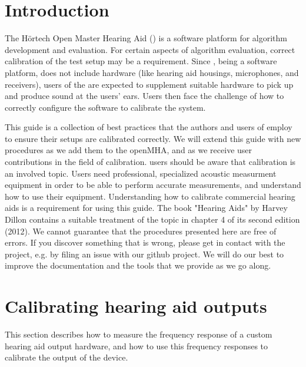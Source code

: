 \documentclass[11pt,a4paper,twoside]{article}
\newcommand{\+}{\discretionary{\mbox{\scriptsize$\hookleftarrow$}}{}{}}
\begin{document}
\newpage
\MHAcopyright{}
\newpage
\tableofcontents
\newpage
\renewcommand{\leftmark}{\rightmark}

\section{Introduction}

The H\"{o}rtech Open Master Hearing Aid (\mha{}) is a software platform
for algorithm development and evaluation.
%
For certain aspects of algorithm evaluation, correct calibration of the
test setup may be a requirement.
%
Since \mha{}, being a software platform, does not include hardware
(like hearing aid housings, microphones, and receivers),
users of the \mha{} are expected to supplement suitable hardware
to pick up and produce sound at the users' ears.
%
Users then face the challenge of how to correctly configure the software
to calibrate the system.

This guide is a collection of best practices that the authors and users
of \mha{} employ to ensure their setups are calibrated correctly.
%
We will extend this guide with new procedures as we add them to the
openMHA, and as we receive user contributions in the field of
calibration.
%
\mha{} users should be aware that calibration is an involved topic.
%
Users need professional, specialized acoustic measurment equipment in
order to be able to perform accurate measurements, and understand
how to use their equipment.
%
Understanding how to calibrate commercial hearing aids is a requirement
for using this guide.
%
The book "Hearing Aids" by Harvey Dillon contains a suitable treatment
of the topic in chapter 4 of its second edition (2012).
%
We cannot guarantee that the procedures presented here are free of
errors.
%
If you discover something that is wrong, please get in contact with
the \mha{} project, e.g. by filing an issue with our github project.
%
We will do our best to improve the documentation and the tools that we
provide as we go along.

\section{Calibrating hearing aid outputs}

This section describes how to measure the frequency response of a
custom hearing aid output hardware, and how to use this frequency
responses to calibrate the output of the device.

%
\end{document}
